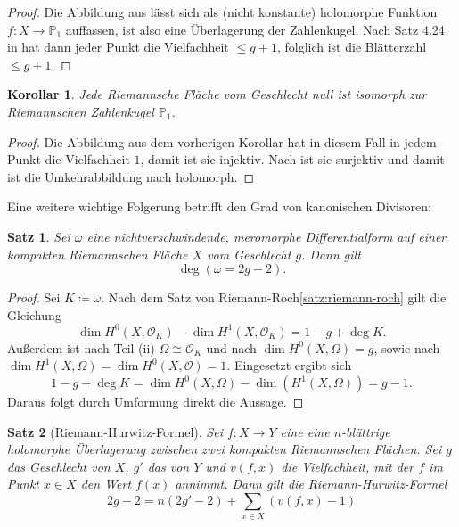 \documentclass[11pt,a4paper,toc=bibliography]{scrartcl}
\theoremstyle{thm}
\newtheorem{satz}{Satz}[section]
\newtheorem{koro}{Korollar}[section]
\theoremstyle{def}
\theoremstyle{remark}
\begin{document}
\begin{proof}
	Die Abbildung aus  lässt sich als (nicht konstante) holomorphe Funktion $f:X\rightarrow \mathbb{P}_1$ auffassen\cite[S.8, Satz 1.15]{forster}, ist also eine Überlagerung der Zahlenkugel\cite[S.18, Satz 4.2]{forster}. Nach Satz 4.24 in \cite{forster} hat dann jeder Punkt die Vielfachheit $\leq g+1$, folglich ist die Blätterzahl $\leq g+1$.
	
\end{proof}
\begin{koro}
	Jede Riemannsche Fläche vom Geschlecht null ist isomorph zur Riemannschen Zahlenkugel $\mathbb{P}_1$.
\end{koro}
\begin{proof}
	Die Abbildung aus dem vorherigen Korollar hat in diesem Fall in jedem Punkt die Vielfachheit $1$, damit ist sie injektiv. Nach \cite[Satz 2.7]{forster} ist sie surjektiv und damit ist die Umkehrabbildung nach \cite[Korollar 2.5]{forster} holomorph. 
\end{proof}
Eine weitere wichtige Folgerung betrifft den Grad von kanonischen Divisoren:
\begin{satz}
	Sei $\omega$ eine nichtverschwindende, meromorphe Differentialform auf einer kompakten Riemannschen Fläche $X$ vom Geschlecht $g$. Dann gilt 
	\[\deg (\omega = 2g-2).
	\]
\end{satz}
\begin{proof}
		Sei $K\coloneqq \omega.$ Nach dem Satz von Riemann-Roch\ref{satz:riemann-roch} gilt die Gleichung
		\[
		\dim H^0(X,\mathcal{O}_K)-\dim H^1(X,\mathcal{O}_K)=1-g+\deg K.
		\]
		Außerdem ist nach  Teil (ii) $\Omega\cong\mathcal{O}_K$ und nach \cite[17.10]{forster} $\dim H^0(X,\Omega)=g$, sowie nach \cite[17.11]{forster} $\dim H^1(X,\Omega)=\dim H^0(X,\mathcal{O})=1$. Eingesetzt ergibt sich
		\[
		1-g+\deg K = \dim H^0(X,\Omega)-\dim(H^1(X,\Omega))=g-1.
		\]
		Daraus folgt durch Umformung direkt die Aussage.
\end{proof}
\begin{satz}[Riemann-Hurwitz-Formel]
	Sei $f:X\rightarrow Y$ eine eine $n$-blättrige holomorphe Überlagerung zwischen zwei kompakten Riemannschen Flächen. Sei $g$ das Geschlecht von $X$, $g'$ das von $Y$ und $v(f,x)$ die Vielfachheit, mit der $f$ im Punkt $x\in X$ den Wert $f(x)$ annimmt. Dann gilt die Riemann-Hurwitz-Formel
	\[
	2g-2=n(2g'-2)+\sum_{x\in X}\left(v(f,x)-1\right)
	\]
\end{satz}
\end{document}
